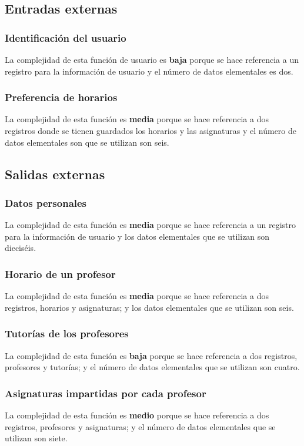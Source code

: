 \documentclass[11pt,a4paper,spanish,twoside]{book}
\begin{document}
\subsection{Entradas externas}
\subsubsection{Identificación del usuario}
La complejidad de esta función de usuario es \textbf{baja} porque se hace
referencia a un registro para la información de usuario y el número de datos
elementales es dos. 

\subsubsection{Preferencia de horarios} 
La complejidad de esta función es \textbf{media} porque se hace
referencia a dos registros donde se tienen guardados los horarios y las
asignaturas y el número de datos elementales son que se utilizan son seis. 

\subsection{Salidas externas}
\subsubsection{Datos personales}
La complejidad de esta función es \textbf{media} porque se hace referencia a
un registro para la información de usuario y los datos elementales que se
utilizan son dieciséis.

\subsubsection{Horario de un profesor}
La complejidad de esta función es \textbf{media} porque se hace referencia a
dos registros, horarios y asignaturas; y los datos elementales que
se utilizan son seis.

\subsubsection{Tutorías de los profesores} 
La complejidad de esta función es \textbf{baja} porque se hace referencia a
dos registros, profesores y tutorías; y el número de datos elementales que se
utilizan son cuatro. 

\subsubsection{Asignaturas impartidas por cada profesor}
La complejidad de esta función es \textbf{medio} porque se hace referencia a
dos registros, profesores y asignaturas; y el número de datos elementales que se
utilizan son siete. 
\end{document}

